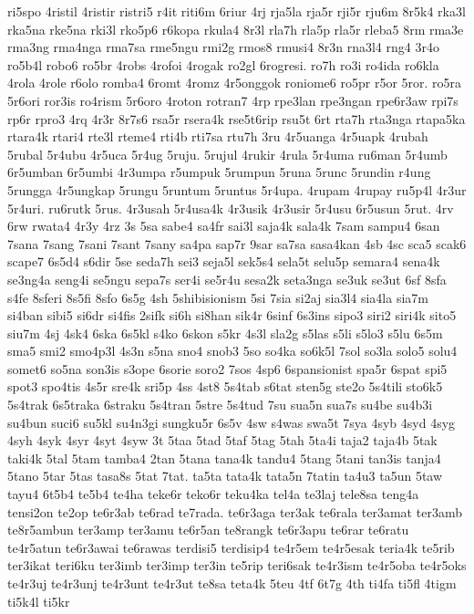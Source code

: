 ri5spo
4ristil
4ristir
ristri5
r4it
riti6m
6riur
4rj
rja5la
rja5r
rji5r
rju6m
8r5k4
rka3l
rka5na
rke5na
rki3l
rko5p6
r6kopa
rkula4
8r3l
rla7h
rla5p
rla5r
rleba5
8rm
rma3e
rma3ng
rma4nga
rma7sa
rme5ngu
rmi2g
rmos8
rmusi4
8r3n
rna3l4
rng4
3r4o
ro5b4l
robo6
ro5br
4robs
4rofoi
4rogak
ro2gl
6rogresi.
ro7h
ro3i
ro4ida
ro6kla
4rola
4role
r6olo
romba4
6romt
4romz
4r5onggok
roniome6
ro5pr
r5or
5ror.
ro5ra
5r6ori
ror3is
ro4rism
5r6oro
4roton
rotran7
4rp
rpe3lan
rpe3ngan
rpe6r3aw
rpi7s
rp6r
rpro3
4rq
4r3r
8r7s6
rsa5r
rsera4k
rse5t6rip
rsu5t
6rt
rta7h
rta3nga
rtapa5ka
rtara4k
rtari4
rte3l
rteme4
rti4b
rti7sa
rtu7h
3ru
4r5uanga
4r5uapk
4rubah
5rubal
5r4ubu
4r5uca
5r4ug
5ruju.
5rujul
4rukir
4rula
5r4uma
ru6man
5r4umb
6r5umban
6r5umbi
4r3umpa
r5umpuk
5rumpun
5runa
5runc
5rundin
r4ung
5rungga
4r5ungkap
5rungu
5runtum
5runtus
5r4upa.
4rupam
4rupay
ru5p4l
4r3ur
5r4uri.
ru6rutk
5rus.
4r3usah
5r4usa4k
4r3usik
4r3usir
5r4usu
6r5usun
5rut.
4rv
6rw
rwata4
4r3y
4rz
3s
5sa
sabe4
sa4fr
sai3l
saja4k
sala4k
7sam
sampu4
6san
7sana
7sang
7sani
7sant
7sany
sa4pa
sap7r
9sar
sa7sa
sasa4kan
4sb
4sc
sca5
scak6
scape7
6s5d4
s6dir
5se
seda7h
sei3
seja5l
sek5s4
sela5t
selu5p
semara4
sena4k
se3ng4a
seng4i
se5ngu
sepa7s
ser4i
se5r4u
sesa2k
seta3nga
se3uk
se3ut
6sf
8sfa
s4fe
8sferi
8s5fi
8sfo
6s5g
4sh
5shibisionism
5si
7sia
si2aj
sia3l4
sia4la
sia7m
si4ban
sibi5
si6dr
si4fis
2sifk
si6h
si8han
sik4r
6sinf
6s3ins
sipo3
siri2
siri4k
sito5
siu7m
4sj
4sk4
6ska
6s5kl
s4ko
6skon
s5kr
4s3l
sla2g
s5las
s5li
s5lo3
s5lu
6s5m
sma5
smi2
smo4p3l
4s3n
s5na
sno4
snob3
5so
so4ka
so6k5l
7sol
so3la
solo5
solu4
somet6
so5na
son3is
s3ope
6sorie
soro2
7sos
4sp6
6spansionist
spa5r
6spat
spi5
spot3
spo4tis
4s5r
sre4k
sri5p
4ss
4st8
5s4tab
s6tat
sten5g
ste2o
5s4tili
sto6k5
5s4trak
6s5traka
6straku
5s4tran
5stre
5s4tud
7su
sua5n
sua7s
su4be
su4b3i
su4bun
suci6
su5kl
su4n3gi
sungku5r
6s5v
4sw
s4was
swa5t
7sya
4syb
4syd
4syg
4syh
4syk
4syr
4syt
4syw
3t
5taa
5tad
5taf
5tag
5tah
5ta4i
taja2
taja4b
5tak
taki4k
5tal
5tam
tamba4
2tan
5tana
tana4k
tandu4
5tang
5tani
tan3is
tanja4
5tano
5tar
5tas
tasa8s
5tat
7tat.
ta5ta
tata4k
tata5n
7tatin
ta4u3
ta5un
5taw
tayu4
6t5b4
te5b4
te4ha
teke6r
teko6r
teku4ka
tel4a
te3laj
tele8sa
teng4a
tensi2on
te2op
te6r3ab
te6rad
te7rada.
te6r3aga
ter3ak
te6rala
ter3amat
ter3amb
te8r5ambun
ter3amp
ter3amu
te6r5an
te8rangk
te6r3apu
te6rar
te6ratu
te4r5atun
te6r3awai
te6rawas
terdisi5
terdisip4
te4r5em
te4r5esak
teria4k
te5rib
ter3ikat
teri6ku
ter3imb
ter3imp
ter3in
te5rip
teri6sak
te4r3ism
te4r5oba
te4r5oks
te4r3uj
te4r3unj
te4r3unt
te4r3ut
te8sa
teta4k
5teu
4tf
6t7g
4th
ti4fa
ti5fl
4tigm
ti5k4l
ti5kr
